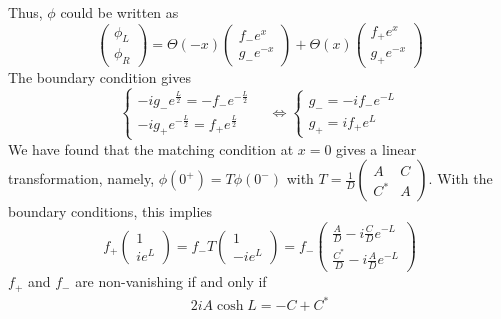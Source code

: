 Thus, $\phi$ could be written as
\begin{equation}
\begin{pmatrix} \phi_L \\ \phi_R \end{pmatrix} = 
\Theta(-x) \begin{pmatrix} f_- e^x  \\ g_-  e^{-x} \end{pmatrix} + 
\Theta(x) \begin{pmatrix} f_+ e^x  \\ g_+  e^{-x} \end{pmatrix}
\end{equation}
The boundary condition gives
\begin{equation}
\begin{cases}
-i g_- e^{\frac{L}{2}} = - f_- e^{-\frac{L}{2}} \\
-ig_+e^{-\frac{L}{2}} = f_+ e^{\frac{L}{2}}
\end{cases} \quad \Leftrightarrow
\begin{cases}
g_- = -i f_- e^{-L} \\
g_+ = i f_+ e^L
\end{cases}
\end{equation}
We have found that the matching condition at $x=0$ gives a linear transformation, namely, $\phi(0^+) = T\phi(0^-)$ with $T = \frac{1}{D}\begin{pmatrix} A & C \\ C^* & A \end{pmatrix}$. 
With the boundary conditions, this implies
\begin{equation}
f_+ \begin{pmatrix} 1 \\ ie^L \end{pmatrix}
= f_- T \begin{pmatrix} 1 \\ -ie^L \end{pmatrix}
= f_- \begin{pmatrix} \frac{A}{D} - i\frac{C}{D} e^{-L}  \\
\frac{C^*}{D} - i \frac{A}{D} e^{-L} \end{pmatrix}
\end{equation}
$f_+$ and $f_-$ are non-vanishing if and only if 
\begin{equation}
\begin{split}
2i A \cosh L = -C + C^*
\end{split}
\end{equation}
